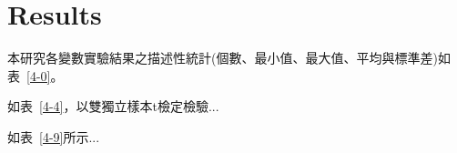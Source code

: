 \chapter{Results}
\label{c:experiment}

本研究各變數實驗結果之描述性統計(個數、最小值、最大值、平均與標準差)如表~\ref{4-0}。





如表~\ref{4-4}，以雙獨立樣本t檢定檢驗...







如表~\ref{4-9}所示...


